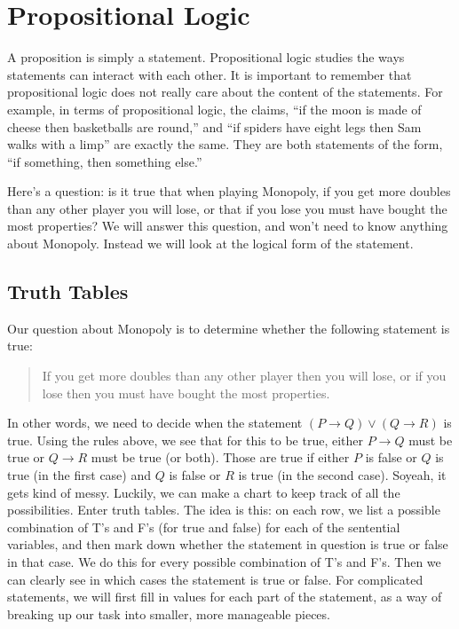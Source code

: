 \documentclass[10pt,]{book}
\theoremstyle{plain}
\theoremstyle{definition}
\theoremstyle{definition}
\theoremstyle{definition}
\numberwithin{equation}{chapter}
\def\imp{\rightarrow}
\begin{document}
\section[Propositional Logic]{Propositional Logic}\label{sec_propositional}


      A proposition is simply a statement. Propositional logic studies the ways statements can interact with each other. It is important to remember that propositional logic does not really care about the content of the statements. For example, in terms of propositional logic, the claims, ``if the moon is made of cheese then basketballs are round,'' and ``if spiders have eight legs then Sam walks with a limp'' are exactly the same. They are both statements of the form, ``if \textlangle something\textrangle, then \textlangle something else\textrangle.''
\par

      Here's a question: is it true that when playing Monopoly, if you get more doubles than any other player you will lose, or that if you lose you must have bought the most properties? We will answer this question, and won't need to know anything about Monopoly. Instead we will look at the logical form of the statement.
%
\typeout{************************************************}
\typeout{************************************************}
\subsection[Truth Tables]{Truth Tables}\label{subsection-27}

\par

          Our question about Monopoly is to determine whether the following statement is true:
\begin{quote}
          If you get more doubles than any other player then you will lose, or if you lose then you must have bought the most properties.
        \end{quote}
\par

          In other words, we need to decide when the statement \((P \imp Q) \vee (Q \imp R)\) is true. Using the rules above, we see that for this to be true, either \(P \imp Q\) must be true or \(Q \imp R\) must be true (or both). Those are true if either \(P\) is false or \(Q\) is true (in the first case) and \(Q\) is false or \(R\) is true (in the second case). So\textemdash{}yeah, it gets kind of messy. Luckily, we can make a chart to keep track of all the possibilities. Enter truth tables. The idea is this: on each row, we list a possible combination of T's and F's (for true and false) for each of the sentential variables, and then mark down whether the statement in question is true or false in that case. We do this for every possible combination of T's and F's. Then we can clearly see in which cases the statement is true or false. For complicated statements, we will first fill in values for each part of the statement, as a way of breaking up our task into smaller,
          more manageable pieces.
\par
\end{document}
